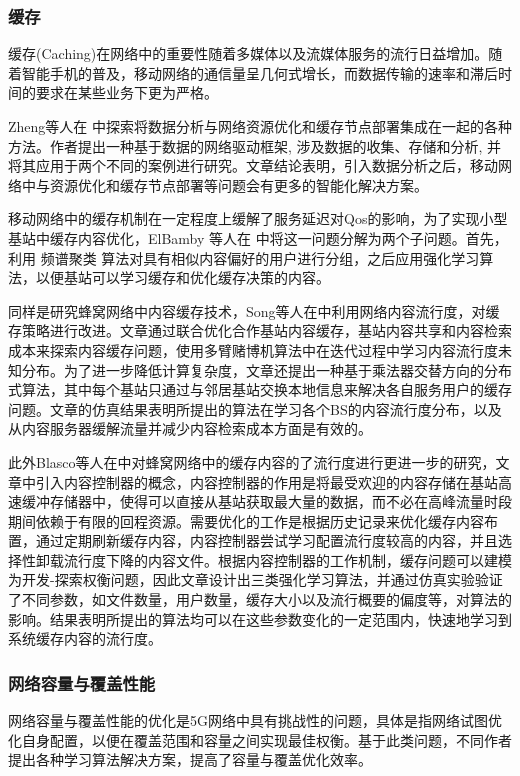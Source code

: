 \documentclass{IEEEtran}
\begin{document}
\subsubsection{缓存}

缓存(Caching)在网络中的重要性随着多媒体以及流媒体服务的流行日益增加。随着智能手机的普及，移动网络的通信量呈几何式增长，而数据传输的速率和滞后时间的要求在某些业务下更为严格。

Zheng等人在\cite{Zheng2016} 中探索将数据分析与网络资源优化和缓存节点部署集成在一起的各种方法。作者提出一种基于数据的网络驱动框架, 涉及数据的收集、存储和分析, 并将其应用于两个不同的案例进行研究。文章结论表明，引入数据分析之后，移动网络中与资源优化和缓存节点部署等问题会有更多的智能化解决方案。

移动网络中的缓存机制在一定程度上缓解了服务延迟对Qos的影响，为了实现小型基站中缓存内容优化，ElBamby 等人在
\cite{ElBamby2014}中将这一问题分解为两个子问题。首先，利用 频谱聚类 算法对具有相似内容偏好的用户进行分组，之后应用强化学习算法，以便基站可以学习缓存和优化缓存决策的内容。

同样是研究蜂窝网络中内容缓存技术，Song等人在\cite{Song2017}中利用网络内容流行度，对缓存策略进行改进。文章通过联合优化合作基站内容缓存，基站内容共享和内容检索成本来探索内容缓存问题，使用多臂赌博机算法中在迭代过程中学习内容流行度未知分布。为了进一步降低计算复杂度，文章还提出一种基于乘法器交替方向的分布式算法，其中每个基站只通过与邻居基站交换本地信息来解决各自服务用户的缓存问题。文章的仿真结果表明所提出的算法在学习各个BS的内容流行度分布，以及从内容服务器缓解流量并减少内容检索成本方面是有效的。

此外Blasco等人在\cite{Blasco2014}中对蜂窝网络中的缓存内容的了流行度进行更进一步的研究，文章中引入内容控制器的概念，内容控制器的作用是将最受欢迎的内容存储在基站高速缓冲存储器中，使得可以直接从基站获取最大量的数据，而不必在高峰流量时段期间依赖于有限的回程资源。需要优化的工作是根据历史记录来优化缓存内容布置，通过定期刷新缓存内容，内容控制器尝试学习配置流行度较高的内容，并且选择性卸载流行度下降的内容文件。根据内容控制器的工作机制，缓存问题可以建模为开发-探索权衡问题，因此文章设计出三类强化学习算法，并通过仿真实验验证了不同参数，如文件数量，用户数量，缓存大小以及流行概要的偏度等，对算法的影响。结果表明所提出的算法均可以在这些参数变化的一定范围内，快速地学习到系统缓存内容的流行度。



\subsubsection{网络容量与覆盖性能}
网络容量与覆盖性能的优化是5G网络中具有挑战性的问题，具体是指网络试图优化自身配置，以便在覆盖范围和容量之间实现最佳权衡。基于此类问题，不同作者提出各种学习算法解决方案，提高了容量与覆盖优化效率。
\end{document}
